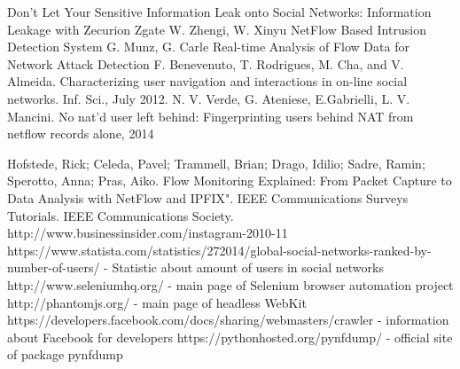 \begin{thebibliography}{9}
Don’t Let Your Sensitive Information Leak onto Social Networks: Information Leakage with Zecurion Zgate
W. Zhengi, W. Xinyu NetFlow Based Intrusion Detection System
G. Munz, G. Carle Real-time Analysis of Flow Data for Network Attack Detection
F. Benevenuto, T. Rodrigues, M. Cha, and V. Almeida. Characterizing user navigation and interactions in on-line social networks. Inf. Sci., July 2012.
N. V. Verde, G. Ateniese, E.Gabrielli, L. V. Mancini. No nat’d user left behind: Fingerprinting users behind NAT from netflow records alone, 2014

Hofstede, Rick; Celeda, Pavel; Trammell, Brian; Drago, Idilio; Sadre, Ramin; Sperotto, Anna; Pras, Aiko. Flow Monitoring Explained: From Packet Capture to Data Analysis with NetFlow and IPFIX". IEEE Communications Surveys Tutorials. IEEE Communications Society.
http://www.businessinsider.com/instagram-2010-11
https://www.statista.com/statistics/272014/global-social-networks-ranked-by-number-of-users/ - Statistic about amount of users in social networks
http://www.seleniumhq.org/ - main page of Selenium browser automation project
http://phantomjs.org/ - main page of headless WebKit
https://developers.facebook.com/docs/sharing/webmasters/crawler - information about Facebook for developers
https://pythonhosted.org/pynfdump/ - official site of package pynfdump
\end{thebibliography}
